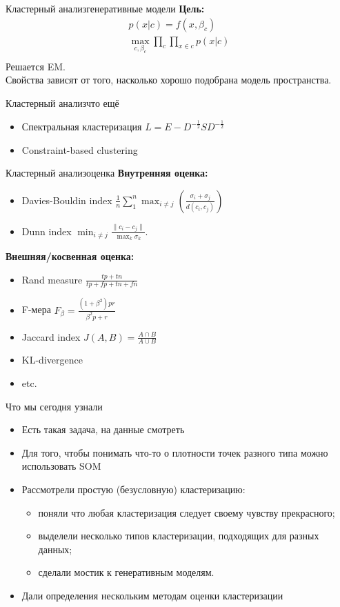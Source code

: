 \documentclass[14pt, fleqn, xcolor={dvipsnames, table}]{beamer}
\begin{document}
\begin{frame}{Кластерный анализ}{генеративные модели}
\textbf{Цель:} 
$$\begin{array}{l}
  p(x|c) = f(x, \beta_c) \\
  \max_{c, \beta_c}\prod_c \prod_{x\in c} p(x|c) \\
\end{array}$$
Решается EM. \\
Свойства зависят от того, насколько хорошо подобрана модель пространства. \\
\end{frame}

\begin{frame}{Кластерный анализ}{что ещё}
\begin{itemize}
  \item Спектральная кластеризация $L = E - D^{-\frac{1}{2}}SD^{-\frac{1}{2}}$
  \item Constraint-based clustering 
\end{itemize}
\end{frame}

\begin{frame}{Кластерный анализ}{оценка}
\textbf{Внутренняя оценка:}
\begin{itemize}
  \item Davies-Bouldin index $\frac{1}{n}\sum_1^n \max_{i \ne j}(\frac{\sigma_i + \sigma_j}{d(c_i, c_j)})$
  \item Dunn index $\min_{i \ne j} \frac{\|c_i - c_j\|}{\max_k \sigma_k}$.
\end{itemize}
\textbf{Внешняя/косвенная оценка:} 
\begin{itemize}
  \item Rand measure $\frac{tp+tn}{tp+fp+tn+fn}$
  \item F-мера $F_{\beta} = \frac {(1 + \beta^2)pr}{\beta^2p + r}$
  \item Jaccard index $J(A,B) = \frac{A\cap B}{A\cup B}$
  \item KL-divergence
  \item etc.
\end{itemize}
\end{frame}

\begin{frame}{Что мы сегодня узнали}
\begin{itemize}
  \item Есть такая задача, на данные смотреть
  \item Для того, чтобы понимать что-то о плотности точек разного типа можно использовать SOM
  \item Рассмотрели простую (безусловную) кластеризацию:
  \begin{itemize}
    \item поняли что любая кластеризация следует своему чувству прекрасного;
    \item выделели несколько типов кластеризации, подходящих для разных данных;
    \item сделали мостик к генеративным моделям.
  \end{itemize}
  \item Дали определения нескольким методам оценки кластеризации
\end{itemize}
\end{frame}
\end{document}
